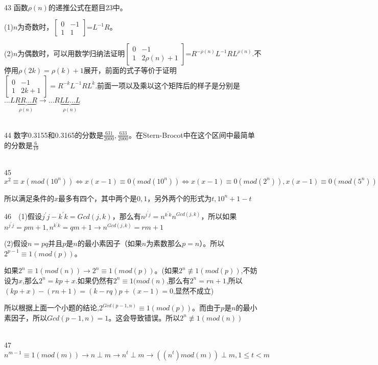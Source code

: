 \documentclass[onecolumn]{article}
\begin{document}
~\\
43 函数$\rho (n)$的递推公式在题目23中。\par
(1)$n$为奇数时，$\begin{bmatrix} 0 &-1 \\  1 &1  \end{bmatrix}$=$L^{-1}R$。\par
(2)$n$为偶数时，可以用数学归纳法证明$\begin{bmatrix}
0 &-1 \\ 
1 &2\rho (n)+1 
\end{bmatrix}$=$R^{-\rho (n)}L^{-1}RL^{\rho(n)}$.不停用$\rho(2k)=\rho(k)+1$展开，前面的式子等价于证明$\begin{bmatrix}
0 &-1 \\ 
1 &2k+1 
\end{bmatrix}=R^{-k}L^{-1}RL^{k}$.前面一项以及乘以这个矩阵后的样子是分别是$...L\underbrace{RR...R}_{\rho(n)}\rightarrow ...R\underbrace{LL...L}_{\rho(n)}$ \par
~\\
44 数字0.3155和0.3165的分数是$\frac{631}{2000},\frac{633}{2000}$。在Stern-Brocot中在这个区间中最简单的分数是$\frac{6}{19}$ \par
~\\
45 $x^{2}\equiv x(mod(10^{n}))\Leftrightarrow x(x-1)\equiv 0(mod(10^{n}))\Leftrightarrow x(x-1)\equiv 0(mod(2^{n})),x(x-1)\equiv 0(mod(5^{n}))\Leftrightarrow (x)mod(2^{n})=0,1,(x)mod(5^{n})=0,1$ \par
所以满足条件的$x$最多有四个，其中两个是$0,1$，另外两个的形式为$t,10^{n}+1-t$ \par
46　(1)假设$j^{'}j-k^{'}k=Gcd(j,k)$，那么有$n^{j^{'}j}=n^{k^{'}k}n^{Gcd(j,k)}$，所以如果$n^{j^{'}j}=pm+1,n^{k^{'}k}=qm+1\rightarrow n^{Gcd(j,k)}=rm+1$ \par
(2)假设$n=pq$并且$p$是$n$的最小素因子（如果$n$为素数那么$p=n$）。所以$2^{p-1}\equiv 1(mod(p))$。\par
如果$2^{n}\equiv 1(mod(n))\rightarrow 2^{n}\equiv 1(mod(p))$。(如果$2^{n}\not\equiv 1(mod(p))$,不妨设为$x$,那么$2^{n}=kp+x$.如果仍然有$2^{n}\equiv 1(mod(n)$,那么有$2^{n}=rn+1$,所以$(kp+x)-(rn+1)=(k-rq)p+(x-1)=0$,显然不成立)\par
所以根据上面一个小题的结论,$2^{Gcd(p-1,n)}\equiv 1(mod(p))$。而由于$p$是$n$的最小素因子，所以$Gcd(p-1,n)=1$。这会导致错误。所以$2^{n}\not\equiv 1(mod(n))$ \par
~\\
47 $n^{m-1}\equiv 1(mod(m))\rightarrow n\perp m\rightarrow n^{t}\perp m\rightarrow \left ((n^{t})mod(m)  \right )\perp m,1\leq t <m$  \par
\end{document}
